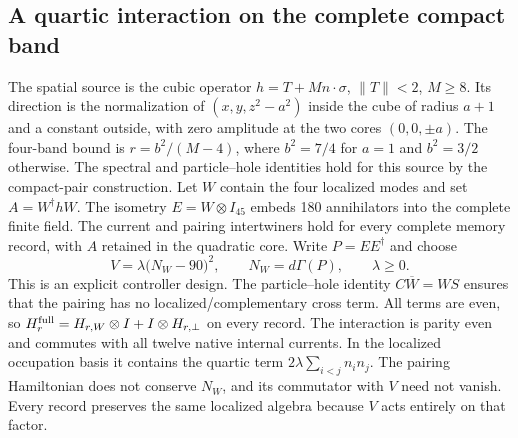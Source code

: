 \subsection{A quartic interaction on the complete compact band}
\label{sec:interacting-localized-response}

The spatial source is the cubic operator $h=T+Mn\cdot\sigma$,
$\|T\|<2$, $M\geq8$. Its direction is the normalization of
$(x,y,z^2-a^2)$ inside the cube of radius $a+1$ and a constant outside,
with zero amplitude at the two cores $(0,0,\pm a)$.
The four-band bound is $r=b^2/(M-4)$, where $b^2=7/4$ for $a=1$
and $b^2=3/2$ otherwise. The spectral and particle--hole identities
hold for this source by the compact-pair construction.
Let $W$ contain the four localized modes and set $A=W^\dagger hW$. The isometry $E=W\otimes I_{45}$ embeds 180 annihilators
into the complete finite field. The current and pairing intertwiners hold
for every complete memory record, with $A$ retained in the quadratic core.
Write $P=EE^\dagger$ and choose
\begin{equation}
 V=\lambda\bigl(N_W-90\bigr)^2,
 \qquad N_W=d\Gamma(P),\qquad \lambda\geq0.
 \label{eq:localized-quartic}
\end{equation}
This is an explicit controller design. The particle--hole identity
$C\overline W=WS$ ensures that the pairing has no localized/complementary
cross term. All terms are even, so
$H_r^{\rm full}=H_{r,W}\otimes I+I\otimes H_{r,\perp}$ on every record.
The interaction is parity even and commutes
with all twelve native internal currents.  In the localized occupation
basis it contains the quartic term
$2\lambda\sum_{i<j}n_i n_j$.  The pairing Hamiltonian does not conserve
$N_W$, and its commutator with $V$ need not vanish.  Every record preserves
the same localized algebra because $V$ acts entirely on that factor.

